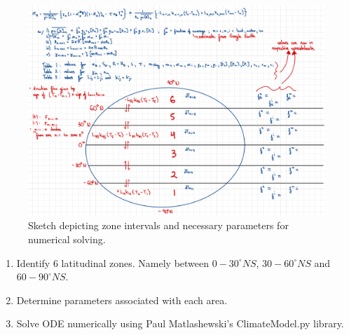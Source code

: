 \documentclass{article}
\begin{document}
\begin{figure}[H]
    \centering
    \includegraphics[scale=0.3]{Graphicalg.pdf}
    \caption{
        Sketch depicting zone intervals and necessary parameters for numerical
        solving.
    }
    \label{fig:graphicalg}
\end{figure}
\FloatBarrier

\begin{enumerate}
    \item Identify 6 latitudinal zones. Namely between $0-30^{\circ}NS$,
    $30-60^{\circ}NS$ and $60-90^{\circ}NS$.
    \item Determine parameters associated with each area.
    \item Solve ODE numerically using Paul Matlashewski's
    ClimateModel.py library.  
\end{enumerate}

\end{document}
